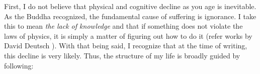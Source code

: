 \documentclass[10pt,twocolumn]{extarticle}
\begin{document}


First, I do not believe that physical and cognitive decline as you age is inevitable. As the Buddha recognized, the fundamental cause of suffering is ignorance. I take this to mean \textit{the lack of knowledge} and that if something does not violate the laws of physics, it is simply a matter of figuring out how to do it (refer works by David Deutsch \cite{deutsch2011beginning}). With that being said, I recognize that at the time of writing, this decline is very likely. Thus, the structure of my life is broadly guided by following:
\end{document}
